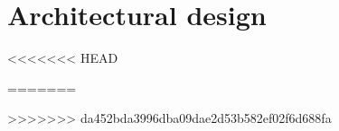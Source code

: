 \chapter{Architectural design}
\label{chap:architectural}
\clearpage


\clearpage
<<<<<<< HEAD

=======

>>>>>>> da452bda3996dba09dae2d53b582ef02f6d688fa

